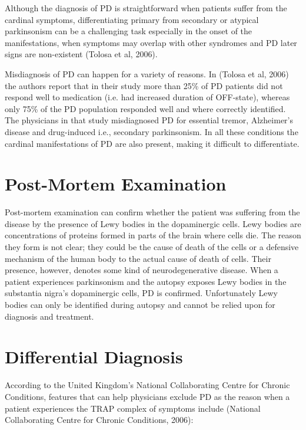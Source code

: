 Although the diagnosis of \gls{PD} is straightforward when patients suffer from the cardinal symptoms, differentiating primary from secondary or atypical parkinsonism can be a challenging task especially in the onset of the manifestations, when symptoms may overlap with other syndromes and \gls{PD} later signs are non-existent (Tolosa et al, 2006).

Misdiagnosis of \gls{PD} can happen for a variety of reasons. In (Tolosa et al, 2006) the authors report that in their study more than 25\% of \gls{PD} patients did not respond well to medication (i.e. had increased duration of OFF-state), whereas only 75\% of the \gls{PD} population responded well and where correctly identified. The physicians in that study misdiagnosed \gls{PD} for essential tremor, Alzheimer's disease and drug-induced i.e., secondary parkinsonism. In all these conditions the cardinal manifestations of \gls{PD} are also present, making it difficult to differentiate. 


\section{Post-Mortem Examination}
\label{sec:lewyBodies}
Post-mortem examination can confirm whether the patient was suffering from the disease by the presence of Lewy bodies in the dopaminergic cells. Lewy bodies are concentrations of proteins formed in parts of the brain where cells die. The reason they form is not clear; they could be the cause of death of the cells or a defensive mechanism of the human body to the actual cause of death of cells. Their presence, however, denotes some kind of neurodegenerative disease. When a patient experiences parkinsonism and the autopsy exposes Lewy bodies in the substantia nigra's dopaminergic cells, \gls{PD} is confirmed. Unfortunately Lewy bodies can only be identified during autopsy and cannot be relied upon for diagnosis and treatment.


\section{Differential Diagnosis}
\label{sec:differential}
According to the United Kingdom's National Collaborating Centre for Chronic Conditions, features that can help physicians exclude \gls{PD} as the reason when a patient experiences the TRAP complex of symptoms include (National Collaborating Centre for Chronic Conditions, 2006):

